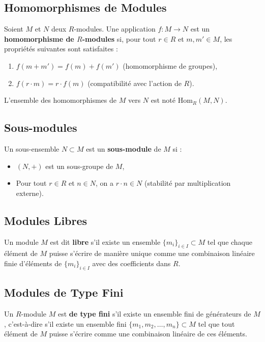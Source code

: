 \documentclass[12pt]{book}
\begin{document}
\subsection*{Homomorphismes de Modules}
Soient \( M \) et \( N \) deux \( R \)-modules. Une application \( f : M \to N \) est un \textbf{homomorphisme de \( R \)-modules} si, pour tout \( r \in R \) et \( m, m' \in M \), les propriétés suivantes sont satisfaites :
\begin{enumerate}
    \item \( f(m + m') = f(m) + f(m') \) (homomorphisme de groupes),
    \item \( f(r \cdot m) = r \cdot f(m) \) (compatibilité avec l'action de \( R \)).
\end{enumerate}

L'ensemble des homomorphismes de \( M \) vers \( N \) est noté \( \mathrm{Hom}_R(M, N) \).

\subsection*{Sous-modules}
Un sous-ensemble \( N \subset M \) est un \textbf{sous-module} de \( M \) si :
\begin{itemize}
    \item \( (N, +) \) est un sous-groupe de \( M \),
    \item Pour tout \( r \in R \) et \( n \in N \), on a \( r \cdot n \in N \) (stabilité par multiplication externe).
\end{itemize}

\subsection*{Modules Libres}
Un module \( M \) est dit \textbf{libre} s'il existe un ensemble \( \{m_i\}_{i \in I} \subset M \) tel que chaque élément de \( M \) puisse s'écrire de manière unique comme une combinaison linéaire finie d'éléments de \( \{m_i\}_{i \in I} \) avec des coefficients dans \( R \).

\subsection*{Modules de Type Fini}
Un \( R \)-module \( M \) est \textbf{de type fini} s'il existe un ensemble fini de générateurs de \( M \), c'est-à-dire s'il existe un ensemble fini \( \{m_1, m_2, \dots, m_n\} \subset M \) tel que tout élément de \( M \) puisse s'écrire comme une combinaison linéaire de ces éléments.
\end{document}
